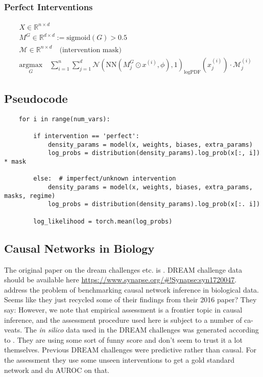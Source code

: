 \documentclass{article}
\begin{document}
\subsubsection{Perfect Interventions}
\begin{equation}
    \begin{split}
        & X \in \mathbb{R}^{n \times d} \\
        & M^G \in \mathbb{R}^{d \times d} := \text{sigmoid}(G) > 0.5 \\
        & \mathcal{M} \in \mathbb{R}^{n \times d} \quad \text{(intervention mask)} \\
        & \underset{G}{\mathrm{argmax}} \quad \sum^n_{i=1} \sum^d_{j=1} \mathcal{N}(\text{NN}(M^G_j \odot x^{(i)}, \phi), 1)_{\text{logPDF}}(x^{(i)}_j) \cdot \mathcal{M}^{(i)}_j
    \end{split}
\end{equation}


\subsection{Pseudocode}
\begin{verbatim}
    for i in range(num_vars):
        
        if intervention == 'perfect':
            density_params = model(x, weights, biases, extra_params)
            log_probs = distribution(density_params).log_prob(x[:, i]) * mask

        else:  # imperfect/unknown intervention
            density_params = model(x, weights, biases, extra_params, masks, regime)
            log_probs = distribution(density_params).log_prob(x[:. i])
        
        log_likelihood = torch.mean(log_probs)

\end{verbatim}


\subsection{Causal Networks in Biology}
The original paper on the dream challenges etc. is \cite{hill2016inferring}.
DREAM challenge data should be available here \url{https://www.synapse.org/#!Synapse:syn1720047}.
\cite{hill2017context} address the problem of benchmarking causal network inference in biological data. Seems like they just recycled some of their findings from their 2016 paper? They say: However, we note that empirical
assessment is a frontier topic in causal inference, and the
assessment procedure used here is subject to a number of ca-
veats.
The \emph{in silico} data used in the DREAM challenges was generated according to \cite{chen2009input}.
They are using some sort of funny score and don't seem to trust it a lot themselves. Previous DREAM challenges were predictive rather than causal.
For the assessment they use some unseen interventions to get a gold standard network and du AUROC on that.
\end{document}
